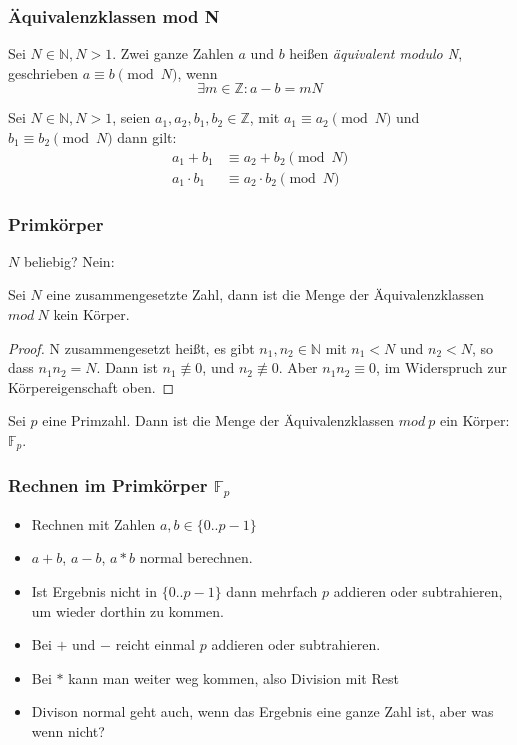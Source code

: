 \documentclass{beamer}
\newcommand{\F}{\mathbb{F}}
\newcommand{\N}{\mathbb{N}}
\newcommand{\Z}{\mathbb{Z}}
\begin{document}
\begin{frame}
  \frametitle{Äquivalenzklassen mod N}
  \begin{definition}
    Sei $N \in \N, N > 1$. Zwei ganze Zahlen $a$ und $b$ heißen
    \emph{äquivalent modulo N}, geschrieben $a \equiv b \pmod N$, wenn
    $$ \exists m \in \Z: a-b = mN $$
  \end{definition}

  \begin{lemma}
    Sei $N \in \N, N > 1$, seien $a_1, a_2, b_1, b_2 \in \Z$,
    mit $a_1 \equiv a_2 \pmod N$ und $b_1 \equiv b_2 \pmod N$  dann gilt:
    \begin{equation}
      \begin{split}
        \label{op:mod}
        a_1 + b_1 & \equiv  a_2 + b_2 \pmod N \\
        a_1 \cdot b_1 & \equiv  a_2 \cdot b_2 \pmod N
      \end{split}
    \end{equation}
  \end{lemma}
\end{frame}

\begin{frame}
  \frametitle{Primkörper}

  $N$ beliebig? Nein:

  \begin{lemma}
  Sei $N$ eine zusammengesetzte Zahl, dann ist die Menge der
  Äquivalenzklassen $mod\ N$ kein Körper.
  \end{lemma}
  \begin{proof}
    N zusammengesetzt heißt, es gibt $n_1, n_2 \in \N$ mit $n_1 < N$
    und $n_2 < N$, so dass $n_1 n_2 = N$. Dann ist $n_1 \not\equiv 0$, und
    $n_2 \not\equiv 0$. Aber $n_1 n_2 \equiv 0$, im Widerspruch zur
    Körpereigenschaft oben.
  \end{proof}
  \begin{theorem}
    Sei $p$ eine Primzahl. Dann ist die Menge der Äquivalenzklassen $mod\ p$
    ein Körper: $\F_p$.
  \end{theorem}
\end{frame}

\begin{frame}
  \frametitle{Rechnen im Primkörper $\F_p$}
  \begin{itemize}
  \item Rechnen mit Zahlen $a, b \in \{0..p-1\}$
  \item $a + b$, $a - b$, $a * b$ normal berechnen.
  \item Ist Ergebnis nicht in $\{0..p-1\}$ dann mehrfach $p$ addieren oder
    subtrahieren, um wieder dorthin zu kommen.
  \item Bei $+$ und $-$ reicht einmal $p$ addieren oder subtrahieren.
  \item Bei $*$ kann man weiter weg kommen, also Division mit Rest
  \item Divison normal geht auch, wenn das Ergebnis eine ganze Zahl ist, aber
    was wenn nicht?
  \end{itemize}
\end{frame}
\end{document}
